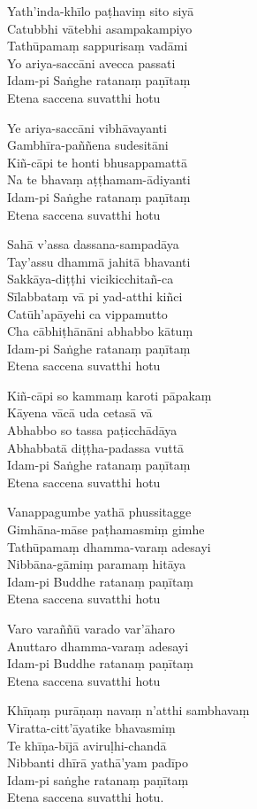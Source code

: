 \begin{paritta}
Yath'inda-khīlo paṭhaviṃ sito siyā\\
Catubbhi vātebhi asampakampiyo\\
Tathūpamaṃ sappurisaṃ vadāmi\\
Yo ariya-saccāni avecca passati\\
Idam-pi Saṅghe ratanaṃ paṇītaṃ\\
Etena saccena suvatthi hotu

Ye ariya-saccāni vibhāvayanti\\
Gambhīra-paññena sudesitāni\\
Kiñ-cāpi te honti bhusappamattā\\
Na te bhavaṃ aṭṭhamam-ādiyanti\\
Idam-pi Saṅghe ratanaṃ paṇītaṃ\\
Etena saccena suvatthi hotu

Sahā v'assa dassana-sampadāya\\
Tay'assu dhammā jahitā bhavanti\\
Sakkāya-diṭṭhi vicikicchitañ-ca\\
Sīlabbataṃ vā pi yad-atthi kiñci\\
Catūh'apāyehi ca vippamutto\\
Cha cābhiṭhānāni abhabbo kātuṃ\\
Idam-pi Saṅghe ratanaṃ paṇītaṃ\\
Etena saccena suvatthi hotu

Kiñ-cāpi so kammaṃ karoti pāpakaṃ\\
Kāyena vācā uda cetasā vā\\
Abhabbo so tassa paṭicchādāya\\
Abhabbatā diṭṭha-padassa vuttā\\
Idam-pi Saṅghe ratanaṃ paṇītaṃ\\
Etena saccena suvatthi hotu

Vanappagumbe yathā phussitagge\\
Gimhāna-māse paṭhamasmiṃ gimhe\\
Tathūpamaṃ dhamma-varaṃ adesayi\\
Nibbāna-gāmiṃ paramaṃ hitāya\\
Idam-pi Buddhe ratanaṃ paṇītaṃ\\
Etena saccena suvatthi hotu

Varo varaññū varado var'āharo\\
Anuttaro dhamma-varaṃ adesayi\\
Idam-pi Buddhe ratanaṃ paṇītaṃ\\
Etena saccena suvatthi hotu

%
Khīṇaṃ purāṇaṃ navaṃ n'atthi sambhavaṃ\\
Viratta-citt'āyatike bhavasmiṃ\\
Te khīṇa-bījā aviruḷhi-chandā\\
Nibbanti dhīrā yathā'yam padīpo\\
Idam-pi saṅghe ratanaṃ paṇītaṃ\\
Etena saccena suvatthi hotu.


\end{paritta}
